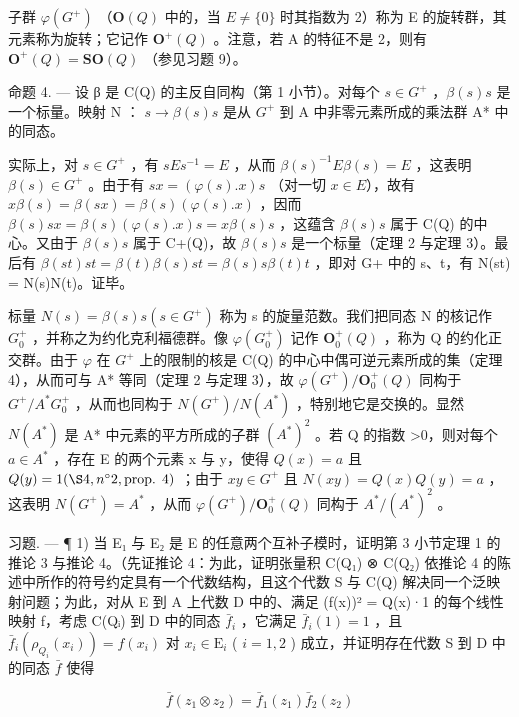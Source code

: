 子群 \(\varphi(G^{+})\) （\(\mathbf{O}(Q)\) 中的，当 \(E \neq \{0\}\) 时其指数为 2）称为 E 的旋转群，其元素称为旋转；它记作 \(\mathbf{O}^{+}(Q)\) 。注意，若 A 的特征不是 2，则有 \(\mathbf{O}^{+}(Q) = \mathbf{S}\mathbf{O}(Q)\) （参见习题 9）。

命题 4. — 设 β 是 C(Q) 的主反自同构（第 1 小节）。对每个 \(s \in G^{+}\) ，\(\beta(s)s\) 是一个标量。映射 N ： \(s \to \beta(s)s\) 是从 \(G^{+}\) 到 A 中非零元素所成的乘法群 A* 中的同态。

实际上，对 \(s \in G^{+}\) ，有 \(sEs^{-1} = E\) ，从而 \(\beta(s)^{-1}E\beta(s) = E\) ，这表明 \(\beta(s) \in G^{+}\) 。由于有 \(sx = (\varphi(s).x)s\) （对一切 \(x \in E\)），故有 \(x\beta(s) = \beta(sx) = \beta(s)(\varphi(s).x)\) ，因而 \(\beta(s)sx = \beta(s)(\varphi(s).x)s = x\beta(s)s\) ，这蕴含 \(\beta(s)s\) 属于 C(Q) 的中心。又由于 \(\beta(s)s\) 属于 C+(Q)，故 \(\beta(s)s\) 是一个标量（定理 2 与定理 3）。最后有 \(\beta(st)st = \beta(t)\beta(s)st = \beta(s)s\beta(t)t\) ，即对 G+ 中的 s、t，有 N(st) = N(s)N(t)。证毕。

标量 \(N(s) = \beta(s)s (s \in G^{+})\) 称为 s 的旋量范数。我们把同态 N 的核记作 \(G_{0}^{+}\) ，并称之为约化克利福德群。像 \(\varphi(G_{0}^{+})\) 记作 \(\mathbf{O}_{0}^{+}(Q)\) ，称为 Q 的约化正交群。由于 \(\varphi\) 在 \(G^{+}\) 上的限制的核是 C(Q) 的中心中偶可逆元素所成的集（定理 4），从而可与 A* 等同（定理 2 与定理 3），故 \(\varphi(G^{+})/\mathbf{O}_{0}^{+}(Q)\) 同构于 \(G^{+}/A^{*}G_{0}^{+}\) ，从而也同构于 \(N(G^{+})/N(A^{*})\) ，特别地它是交换的。显然 \(N(A^{*})\) 是 A* 中元素的平方所成的子群 \((A^{*})^{2}\) 。若 Q 的指数 \textgreater0，则对每个 \(a \in A^{*}\) ，存在 E 的两个元素 x 与 y，使得 \(Q(x) = a\) 且 \(Q(y) = 1 (\S 4, n^{\circ} 2, \text{prop. } 4)\) ；由于 \(xy \in G^{+}\) 且 \(N(xy) = Q(x)Q(y) = a\) ，这表明 \(N(G^{+}) = A^{*}\) ，从而 \(\varphi(G^{+})/\mathbf{O}_{0}^{+}(Q)\) 同构于 \(A^{*}/(A^{*})^{2}\) 。

习题. --- ¶ 1) 当 E₁ 与 E₂ 是 E 的任意两个互补子模时，证明第 3 小节定理 1 的推论 3 与推论 4。（先证推论 4：为此，证明张量积 C(Q₁) ⊗ C(Q₂) 依推论 4 的陈述中所作的符号约定具有一个代数结构，且这个代数 S 与 C(Q) 解决同一个泛映射问题；为此，对从 E 到 A 上代数 D 中的、满足 (f(x))² = Q(x)·1 的每个线性映射 f，考虑 C(Qᵢ) 到 D 中的同态 \(\bar{f}_i\) ，它满足 \(\bar{f}_i(1) = 1\) ，且 \(\bar{f}_i(\rho_{Q_i}(x_i)) = f(x_i)\) 对 \(x_i \in \mathrm{E}_i\) ( \(i = 1, 2\) ) 成立，并证明存在代数 S 到 D 中的同态 \(\bar{f}\) 使得

\[
\bar {f} (z _ {1} \otimes z _ {2}) = \bar {f} _ {1} (z _ {1}) \bar {f} _ {2} (z _ {2})
\]

